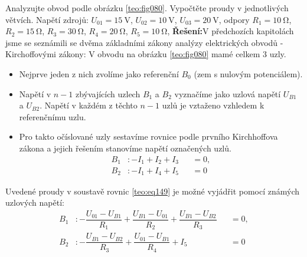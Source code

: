 \begin{mdframed}[style=mdexam]
  \begin{example}\label{TEO:exam020}
    Analyzujte obvod podle obrázku \ref{teo:fig080}. Vypočtěte proudy v jednotlivých větvích. Napětí
    zdrojů: \(U_{01} = \SI{15}{\V}\), \(U_{02} = \SI{10}{\V}\), \(U_{03} = \SI{20}{\V}\), odpory
    \(R_1 = \SI{10}{\ohm}\), \(R_2 = \SI{15}{\ohm}\), \(R_3 = \SI{30}{\ohm}\), \(R_4 =
    \SI{20}{\ohm}\), \(R_5 = \SI{10}{\ohm}\),
    \newline 
    \textbf{Řešení:}\newline V předchozích kapitolách jsme se seznámili se dvěma základními zákony
    analýzy elektrických obvodů - Kirchoffovými zákony: V obvodu na obrázku \ref{teo:fig080} mamé
    celkem 3 uzly. 
    \begin{itemize}
      \item Nejprve jeden z nich zvolíme jako referenční  \(B_0\) (zem s nulovým potenciálem). 
      \item Napětí v \(n-1\) zbývajících uzlech \(B_1\) a \(B_2\) vyznačíme jako uzlová napětí
            \(U_{B1}\) a \(U_{B2}\). Napětí v každém z těchto \(n-1\) uzlů je vztaženo vzhledem k
            referenčnímu uzlu. 
      \item Pro takto očíslované uzly sestavíme rovnice podle prvního Kirchhoffova zákona a jejich
            řešením stanovíme napětí označených uzlů.
            \begin{subequations}\label{teo:eq149}
              \begin{alignat}{2}
                B_1&: -I_1 + I_2 + I_3 &&=0,  \label{teo:eq149a}   \\
                B_2&: -I_1 + I_4 + I_5 &&=0   \label{teo:eq149b} 
              \end{alignat}
            \end{subequations}  
    \end{itemize}
    Uvedené proudy v soustavě rovnic \ref{teo:eq149} je možné vyjádřit pomocí známých uzlových
    napětí:
    \begin{subequations}\label{teo:eq150}
      \begin{alignat}{2}
        B_1&: - \dfrac{U_{01} - U_{B1}}{R_1} 
              + \dfrac{U_{B1} - U_{01}}{R_2} 
              + \dfrac{U_{B1} - U_{B2}}{R_3} &&=0,  \label{teo:eq150a}   \\
        B_2&: - \dfrac{U_{B1} - U_{B2}}{R_3} 
              + \dfrac{U_{01} - U_{B1}}{R_4} + I_5 &&=0   \label{teo:eq150b} 
      \end{alignat}
    \end{subequations}  
    {\centering
    \captionsetup{type=figure}
    \label{teo:fig080}
    \par}


\end{example}
\end{mdframed}
